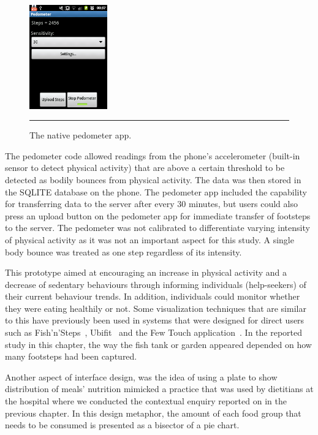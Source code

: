 \begin{figure}[htbp]
  \centering
    \includegraphics[width=0.3\textwidth]{Figures/pedometerapp.png}
    \rule{35em}{0.5pt}
  \caption{The native pedometer app.}
  \label{figure:pedometer_screen}
\end{figure}

The pedometer code allowed readings from the phone's accelerometer (built-in sensor to detect physical activity) that are above a certain threshold to be detected as bodily bounces from physical activity. The data was then stored in the SQLITE database on the phone. The pedometer app included the capability for transferring data to the server after every 30 minutes, but users could also press an upload button on the pedometer app for immediate transfer of footsteps to the server. The pedometer was not calibrated to differentiate varying intensity of physical activity as it was not an important aspect for this study. A single body bounce was treated as one step regardless of its intensity. 

This prototype aimed at encouraging an increase in physical activity and  a decrease of sedentary behaviours through informing individuals (help-seekers) of their current behaviour trends. In addition, individuals could monitor whether they were eating healthily or not. Some visualization techniques that are similar to this have previously been used  in systems that were designed for direct users such as Fish'n'Steps~\citep{lin2006:fish}, Ubifit~\citep{klasnja2009:using}  and the Few Touch application~\citep{arsand:mobile}. In the reported study in this chapter, the way the fish tank or garden appeared depended on how many footsteps had been captured.  

Another aspect of interface design, was the idea of using a plate to show distribution of meals' nutrition mimicked a practice that was used by dietitians at the hospital where we conducted the contextual enquiry reported on in the previous chapter. In this design metaphor, the amount of each food group that needs to be consumed is presented as a bisector of a pie chart. 
